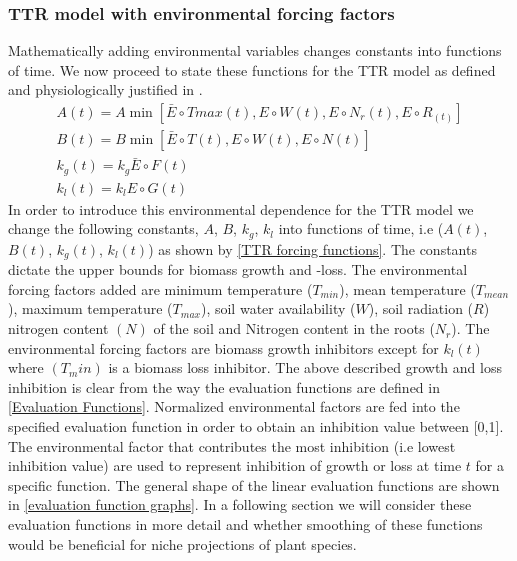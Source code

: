 \documentclass[paper=a4, fontsize=11pt]{scrartcl}
\numberwithin{equation}{section}		%
\numberwithin{figure}{section}			%
\numberwithin{table}{section}				%
\begin{document}
\subsubsection{TTR model with environmental forcing factors}

Mathematically adding environmental variables changes constants into functions of time. We now proceed to state these functions for the TTR model as defined and physiologically justified in \cite{Higgins2012APlants}.   
\begin{align}
A(t) = A\min\left[ \bar{E} \circ Tmax(t),E \circ W(t), E \circ N_r(t), E \circ R_(t) \right] \\
B(t) = B\min\left[ \bar{E} \circ T(t), E \circ W(t), E \circ N(t)\right] \\
k_g(t) = k_g\bar{E} \circ F(t) \\
k_l(t) = k_l E \circ G(t) \label{TTR forcing functions}
\end{align}
In order to introduce this environmental dependence for the TTR model we change the following constants, $A$, $B$, $k_g$, $k_l$ into functions of time, i.e ($A(t)$, $B(t)$, $k_g(t)$, $k_l(t)$) as shown by \ref{TTR forcing functions}. The constants dictate the upper bounds for biomass growth and -loss.  The environmental forcing factors added are minimum temperature ($T_{min}$), mean temperature ($T_{mean}$), maximum temperature ($T_{max}$), soil water availability ($W$), soil radiation ($R$) nitrogen content $(N)$ of the soil and Nitrogen content in the roots ($N_r$). The environmental forcing factors are biomass growth inhibitors except for $k_l(t)$ where $(T_min)$ is a biomass loss inhibitor. The above described growth and loss inhibition is clear from the way the evaluation functions are defined in \ref{Evaluation Functions}.   
Normalized environmental factors are fed into the specified evaluation function in order to obtain an inhibition value between [0,1]. The environmental factor that contributes the most inhibition (i.e lowest inhibition value) are used to represent inhibition of growth or loss at time $t$ for a specific function. The general shape of the linear evaluation functions are shown in \ref{evaluation function graphs}. In a following section we will consider these evaluation functions in more detail and whether smoothing of these functions would be beneficial for niche projections of plant species.   
\end{document}
